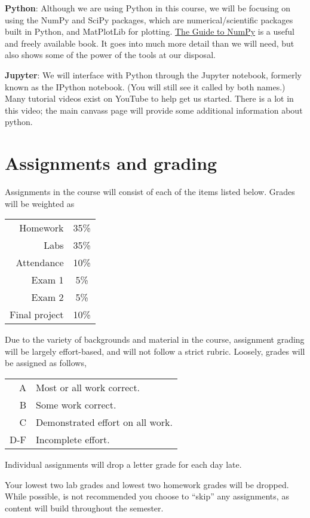 \documentclass[11pt]{article}
\begin{document}
{\bf Python}: Although we are using Python in this course, we will be focusing on using the NumPy and SciPy packages, which are numerical/scientific packages built in Python, and MatPlotLib for plotting. \href{https://docs.scipy.org/doc/_static/numpybook.pdf}{The Guide to NumPy} is a useful and freely available book. It goes into much more detail than we will need, but also shows some of the power of the tools at our disposal.

{\bf Jupyter}: We will interface with Python through the Jupyter notebook, formerly known as the IPython notebook. (You will still see it called by both names.) Many tutorial videos exist on YouTube to help get us started. There is a lot in this video; the main canvass page will provide some additional information about python.

% 
\clearpage

\section*{Assignments and grading}

Assignments in the course will consist of each of the items listed below. Grades will be weighted as

\begin{tabular}{r c}
Homework & 35\% \\
Labs & 35\% \\
Attendance & 10\% \\
Exam 1 & 5\%  \\
Exam 2 & 5\% \\
Final project & 10\%
\end{tabular}

Due to the variety of backgrounds and material in the course, 
assignment grading will be largely effort-based, and will not
follow a strict rubric. Loosely, grades will be assigned as follows,

\begin{tabular}{r l}
A & Most or all work correct. \\
B & Some work correct. \\
C & Demonstrated effort on all work. \\
D-F & Incomplete effort. \\
\end{tabular}

Individual assignments will drop a letter grade for each day late.

Your lowest two lab grades and lowest two homework grades will be dropped.
While possible, is not recommended you choose to ``skip'' any assignments,
as content will build throughout the semester.
\end{document}

